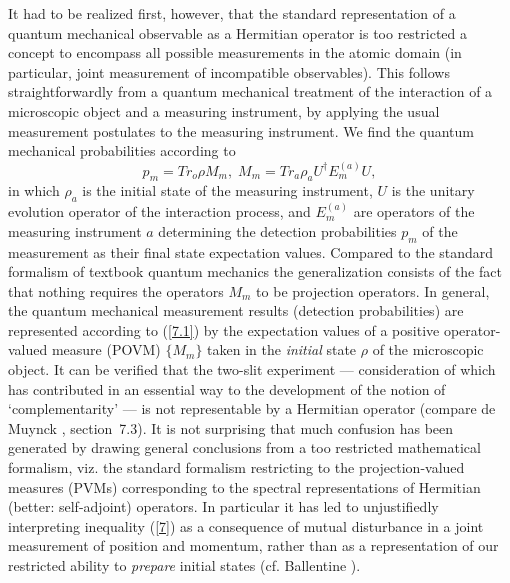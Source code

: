 \documentclass[12pt]{article}
\begin{document}
It had to be realized first,
however, that the standard representation of a quantum mechanical
observable as a Hermitian operator is too restricted a concept to
encompass all possible measurements in the atomic domain (in
particular, joint measurement of incompatible observables). This
follows straightforwardly from a quantum mechanical treatment of
the interaction of a microscopic object and a measuring
instrument, by applying the usual measurement postulates to the
measuring instrument. We find the quantum mechanical probabilities
according to
\begin{equation}\label{7.1}
    p_m=Tr_o \rho M_m,\; M_m=Tr_a \rho_a U^\dagger E_m^{(a)}U,
\end{equation}
in which $\rho_a$ is the initial state of the measuring
instrument, $U$ is the unitary evolution operator of the
interaction process, and $E_m^{(a)}$ are operators of the
measuring instrument $a$ determining the detection probabilities
$p_m$ of the measurement as their final state expectation values.
Compared to the standard formalism of textbook quantum mechanics
the generalization consists of the fact that nothing requires the
operators $M_m$ to be projection operators. In general, the
quantum mechanical measurement results (detection probabilities)
are represented according to (\ref{7.1}) by the expectation values
of a positive operator-valued measure (POVM) $\{M_m\}$ taken in
the {\em initial} state $\rho$ of the microscopic object. It can
be verified that the two-slit experiment --- consideration of which
has contributed in an essential way to the development of the
notion of `complementarity' --- is not representable by a Hermitian
operator (compare de Muynck \cite{dM2002}, section~7.3). It is not
surprising that much confusion has been generated by drawing
general conclusions from a too restricted mathematical formalism,
viz. the standard formalism restricting to the projection-valued
measures (PVMs) corresponding to the spectral representations of
Hermitian (better: self-adjoint) operators. In particular it has
led to unjustifiedly interpreting inequality (\ref{7}) as a
consequence of mutual disturbance in a joint measurement of
position and momentum, rather than as a representation of our
restricted ability to {\em prepare} initial states (cf. Ballentine
\cite{Bal70}).
\end{document}
